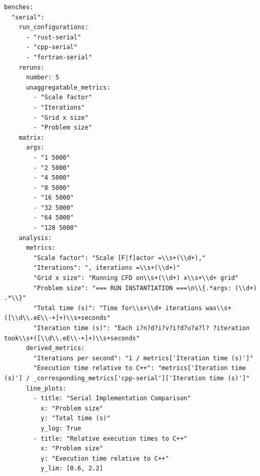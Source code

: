 \begin{code}
\begin{verbatim}
benches:
  "serial":
    run_configurations:
      - "rust-serial"
      - "cpp-serial"
      - "fortran-serial"
    reruns:
      number: 5
      unaggregatable_metrics:
        - "Scale factor"
        - "Iterations"
        - "Grid x size"
        - "Problem size"
    matrix:
      args:
        - "1 5000"
        - "2 5000"
        - "4 5000"
        - "8 5000"
        - "16 5000"
        - "32 5000"
        - "64 5000"
        - "128 5000"
    analysis:
      metrics:
        "Scale factor": "Scale [F|f]actor =\\s+(\\d+),"
        "Iterations": ", iterations =\\s+(\\d+)"
        "Grid x size": "Running CFD on\\s+(\\d+) x\\s+\\d+ grid"
        "Problem size": "=== RUN INSTANTIATION ===\n\\{.*args: (\\d+) .*\\}"
        "Total time (s)": "Time for\\s+\\d+ iterations was\\s+([\\d\\.eE\\-+]+)\\s+seconds"
        "Iteration time (s)": "Each i?n?d?i?v?i?d?u?a?l? ?iteration took\\s+([\\d\\.eE\\-+]+)\\s+seconds"
      derived_metrics:
        "Iterations per second": "1 / metrics['Iteration time (s)']"
        "Execution time relative to C++": "metrics['Iteration time (s)'] / _corresponding_metrics['cpp-serial']['Iteration time (s)']"
      line_plots:
        - title: "Serial Implementation Comparison"
          x: "Problem size"
          y: "Total time (s)"
          y_log: True
        - title: "Relative execution times to C++"
          x: "Problem size"
          y: "Execution time relative to C++"
          y_lim: [0.6, 2.2]


\end{verbatim}
\end{code}
